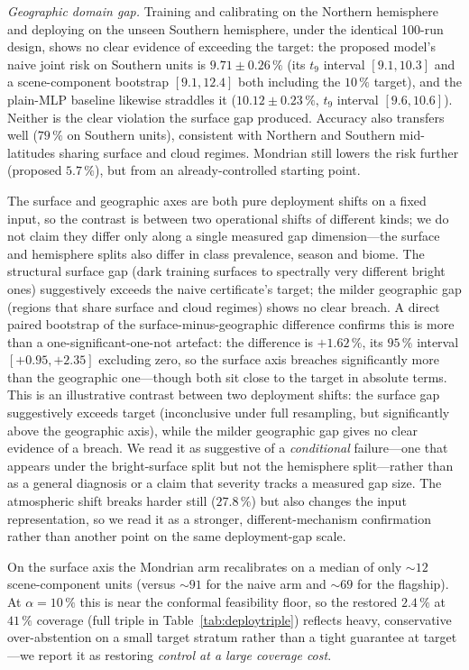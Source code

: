 \documentclass[preprint,3p,times]{elsarticle}
\begin{document}
\emph{Geographic domain gap.} Training and calibrating on the Northern hemisphere and deploying on the unseen Southern hemisphere, under the identical 100-run design, shows no clear evidence of exceeding the target: the proposed model's naive joint risk on Southern units is $9.71 \pm 0.26\,\%$ (its $t_9$ interval $[9.1, 10.3]$ and a scene-component bootstrap $[9.1, 12.4]$ both including the $10\,\%$ target), and the plain-MLP baseline likewise straddles it ($10.12 \pm 0.23\,\%$, $t_9$ interval $[9.6, 10.6]$). Neither is the clear violation the surface gap produced. Accuracy also transfers well ($79\,\%$ on Southern units), consistent with Northern and Southern mid-latitudes sharing surface and cloud regimes. Mondrian still lowers the risk further (proposed $5.7\,\%$), but from an already-controlled starting point.

The surface and geographic axes are both pure deployment shifts on a fixed input, so the contrast is between two operational shifts of different kinds; we do not claim they differ only along a single measured gap dimension---the surface and hemisphere splits also differ in class prevalence, season and biome. The structural surface gap (dark training surfaces to spectrally very different bright ones) suggestively exceeds the naive certificate's target; the milder geographic gap (regions that share surface and cloud regimes) shows no clear breach. A direct paired bootstrap of the surface-minus-geographic difference confirms this is more than a one-significant-one-not artefact: the difference is $+1.62\,\%$, its $95\,\%$ interval $[+0.95, +2.35]$ excluding zero, so the surface axis breaches significantly more than the geographic one---though both sit close to the target in absolute terms. This is an illustrative contrast between two deployment shifts: the surface gap suggestively exceeds target (inconclusive under full resampling, but significantly above the geographic axis), while the milder geographic gap gives no clear evidence of a breach. We read it as suggestive of a \emph{conditional} failure---one that appears under the bright-surface split but not the hemisphere split---rather than as a general diagnosis or a claim that severity tracks a measured gap size. The atmospheric shift breaks harder still ($27.8\,\%$) but also changes the input representation, so we read it as a stronger, different-mechanism confirmation rather than another point on the same deployment-gap scale.

On the surface axis the Mondrian arm recalibrates on a median of only ${\sim}12$ scene-component units (versus ${\sim}91$ for the naive arm and ${\sim}69$ for the flagship). At $\alpha = 10\,\%$ this is near the conformal feasibility floor, so the restored $2.4\,\%$ at $41\,\%$ coverage (full triple in Table~\ref{tab:deploytriple}) reflects heavy, conservative over-abstention on a small target stratum rather than a tight guarantee at target---we report it as restoring \emph{control at a large coverage cost}.
\end{document}
